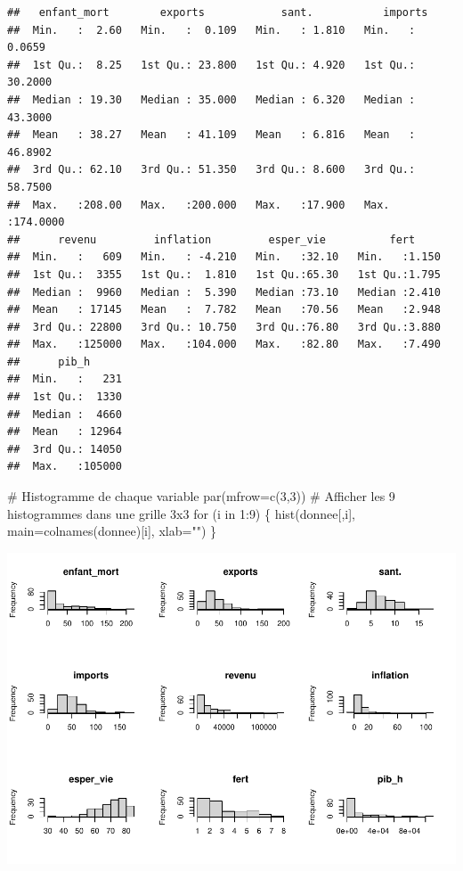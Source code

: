 \documentclass[
]{article}
\newenvironment{Shaded}{}{}
\newcommand{\AttributeTok}[1]{#1}
\newcommand{\CommentTok}[1]{\textcolor[rgb]{0.00,0.50,0.00}{#1}}
\newcommand{\ControlFlowTok}[1]{\textcolor[rgb]{0.00,0.00,1.00}{#1}}
\newcommand{\DecValTok}[1]{#1}
\newcommand{\FunctionTok}[1]{#1}
\newcommand{\NormalTok}[1]{#1}
\newcommand{\SpecialCharTok}[1]{\textcolor[rgb]{0.00,0.50,0.50}{#1}}
\newcommand{\StringTok}[1]{\textcolor[rgb]{0.00,0.50,0.50}{#1}}
\begin{document}
\begin{verbatim}
##   enfant_mort        exports            sant.           imports        
##  Min.   :  2.60   Min.   :  0.109   Min.   : 1.810   Min.   :  0.0659  
##  1st Qu.:  8.25   1st Qu.: 23.800   1st Qu.: 4.920   1st Qu.: 30.2000  
##  Median : 19.30   Median : 35.000   Median : 6.320   Median : 43.3000  
##  Mean   : 38.27   Mean   : 41.109   Mean   : 6.816   Mean   : 46.8902  
##  3rd Qu.: 62.10   3rd Qu.: 51.350   3rd Qu.: 8.600   3rd Qu.: 58.7500  
##  Max.   :208.00   Max.   :200.000   Max.   :17.900   Max.   :174.0000  
##      revenu         inflation         esper_vie          fert      
##  Min.   :   609   Min.   : -4.210   Min.   :32.10   Min.   :1.150  
##  1st Qu.:  3355   1st Qu.:  1.810   1st Qu.:65.30   1st Qu.:1.795  
##  Median :  9960   Median :  5.390   Median :73.10   Median :2.410  
##  Mean   : 17145   Mean   :  7.782   Mean   :70.56   Mean   :2.948  
##  3rd Qu.: 22800   3rd Qu.: 10.750   3rd Qu.:76.80   3rd Qu.:3.880  
##  Max.   :125000   Max.   :104.000   Max.   :82.80   Max.   :7.490  
##      pib_h       
##  Min.   :   231  
##  1st Qu.:  1330  
##  Median :  4660  
##  Mean   : 12964  
##  3rd Qu.: 14050  
##  Max.   :105000
\end{verbatim}

\begin{Shaded}
\begin{Highlighting}[]
\CommentTok{\# Histogramme de chaque variable}
\FunctionTok{par}\NormalTok{(}\AttributeTok{mfrow=}\FunctionTok{c}\NormalTok{(}\DecValTok{3}\NormalTok{,}\DecValTok{3}\NormalTok{)) }\CommentTok{\# Afficher les 9 histogrammes dans une grille 3x3}
\ControlFlowTok{for}\NormalTok{ (i }\ControlFlowTok{in} \DecValTok{1}\SpecialCharTok{:}\DecValTok{9}\NormalTok{) \{}
  \FunctionTok{hist}\NormalTok{(donnee[,i], }\AttributeTok{main=}\FunctionTok{colnames}\NormalTok{(donnee)[i], }\AttributeTok{xlab=}\StringTok{""}\NormalTok{)}
\NormalTok{\}}
\end{Highlighting}
\end{Shaded}

\includegraphics{projet_classification_files/figure-latex/unnamed-chunk-5-1.pdf}
\end{document}
